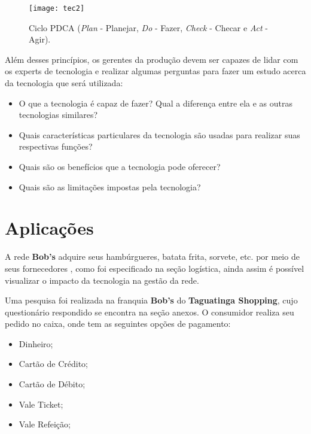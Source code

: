 		\newpage
		\begin{figure}[h]
			\centering
			\texttt{[image: tec2]}
			\caption[Ciclo PDCA (Plan - Planejar, Do - Fazer, Check - Checar e Act - Agir) ]{Ciclo PDCA (\emph{Plan} - Planejar, \emph{Do} - Fazer, \emph{Check} - Checar e \emph{Act} - Agir).}
			\label{fig:tec2}
		\end{figure}

		Além desses princípios, os gerentes da produção devem ser capazes de lidar com os experts de tecnologia e realizar algumas perguntas para fazer um estudo acerca da tecnologia que será utilizada: 

		\begin{itemize}
			\item{O que a tecnologia é capaz de fazer? Qual a diferença entre ela e as outras tecnologias similares?}
			\item{Quais características particulares da tecnologia são usadas para realizar suas respectivas funções?}
			\item{Quais são os benefícios que a tecnologia pode oferecer?}
			\item{Quais são as limitações impostas pela tecnologia?}
		\end{itemize}

	\section[Aplicações]{Aplicações}
	\label{sec:tecnologias_aplicacoes}

		A rede \textbf{Bob’s} adquire seus hambúrgueres, batata frita, sorvete, etc. por meio de seus fornecedores \cite{junior}, como foi especificado na seção logística, ainda assim é possível visualizar o impacto da tecnologia na gestão da rede.
	
		Uma pesquisa foi realizada na franquia \textbf{Bob’s} do \textbf{Taguatinga Shopping}, cujo questionário respondido se encontra na seção anexos. O consumidor realiza seu pedido no caixa, onde tem as seguintes opções de pagamento:

		\begin{itemize}
			\item{Dinheiro};
			\item{Cartão de Crédito};
			\item{Cartão de Débito};
			\item{Vale Ticket};
			\item{Vale Refeição};
		\end{itemize}

